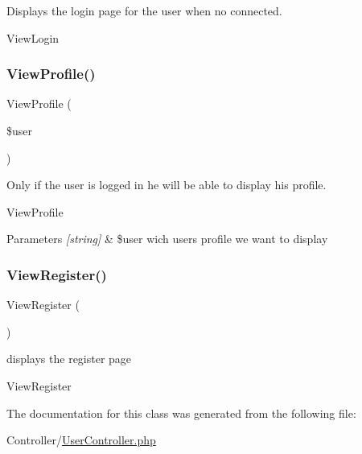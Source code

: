 Displays the login page for the user when no connected. 

View\+Login \mbox{\label{class_user_controller_aef362c29f717367e1431984a55ec4f4a}} 
\subsubsection{\texorpdfstring{View\+Profile()}{ViewProfile()}}
{\footnotesize\ttfamily View\+Profile (\begin{DoxyParamCaption}\item[{}]{\$user }\end{DoxyParamCaption})}



Only if the user is logged in he will be able to display his profile. 

View\+Profile


\begin{DoxyParams}{Parameters}
{\em \mbox{[}string\mbox{]}} & \$user wich user\textquotesingle{}s profile we want to display \\
\hline
\end{DoxyParams}
\mbox{\label{class_user_controller_a4b78247221086a92c1688dbba1f5c6b7}} 
\subsubsection{\texorpdfstring{View\+Register()}{ViewRegister()}}
{\footnotesize\ttfamily View\+Register (\begin{DoxyParamCaption}{ }\end{DoxyParamCaption})}



displays the register page 

View\+Register 

The documentation for this class was generated from the following file\+:\begin{DoxyCompactItemize}
\item 
Controller/\hyperlink{_user_controller_8php}{User\+Controller.\+php}\end{DoxyCompactItemize}
